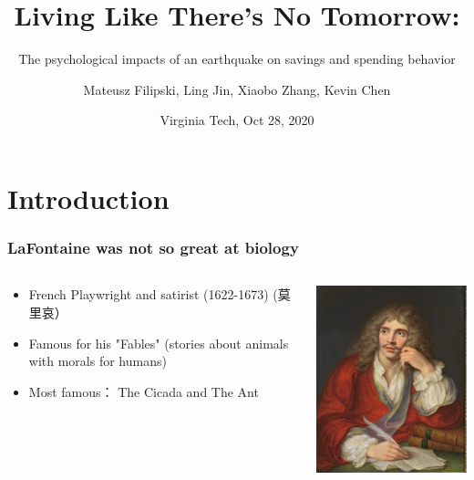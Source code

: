 \documentclass[aspectratio=169]{beamer}
\title[Living Like There's No Tomorrow]{Living Like There's No Tomorrow:}
\subtitle{The psychological impacts of an earthquake on savings and spending behavior}
\author{Mateusz Filipski, Ling Jin, Xiaobo Zhang, Kevin Chen}
\institute{UGA, Huazhong Agricultural U., Beijing U., Zhejiang U., IFPRI}
\date{Virginia Tech, Oct 28, 2020}
\begin{document}
\frame{\titlepage}

\section*{Introduction}
\begin{frame}[label=top]
    \frametitle{\Large{LaFontaine was not so great at biology}}
    \begin{columns}
    \begin{column}{0.5\textwidth}
        \begin{itemize}
            \item French Playwright and satirist (1622-1673) (莫里哀）
            \item Famous for his "Fables" (stories about animals with morals for humans)
            \item Most famous： 
            The Cicada and The Ant
        \end{itemize}
    \end{column}
    \begin{column}{0.5\textwidth}  %
    \begin{center}
    \includegraphics[scale=0.55]{pics/moliere.png}     \end{center}
\end{column}
\end{columns}
\end{frame}  
\end{document}
